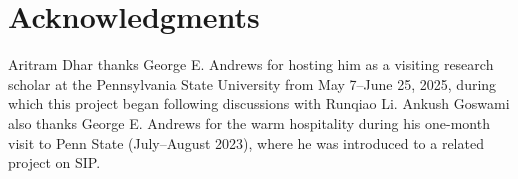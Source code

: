 \documentclass[12pt]{amsart}
\theoremstyle{definition}
\theoremstyle{remark}
\numberwithin{equation}{section}
\begin{document}
\section*{Acknowledgments}
Aritram Dhar thanks George E. Andrews for hosting him as a visiting research scholar at the Pennsylvania State University from May 7--June 25, 2025, during which this project began following discussions with Runqiao Li. Ankush Goswami also thanks George E. Andrews for the warm hospitality during his one-month visit to Penn State (July--August 2023), where he was introduced to a related project on SIP.
\end{document}
